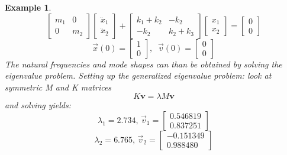 \documentclass[12pt,letter]{article}
\newtheorem{ex}{Example}
\numberwithin{ex}{section} %
\newenvironment{example}{\begin{mdframed}[middlelinewidth=0.5mm]\begin{ex}\normalfont}{\end{ex}\end{mdframed}}
\numberwithin{re}{section} %
\newcommand{\rd}[1]{\textcolor[rgb]{0.75,0.00,0.00}{#1}}
\begin{document}
\begin{example}
\begin{equation}
	  \begin{bmatrix} m_1 & 0 \\    0  & m_2 \end{bmatrix} \begin{bmatrix} \ddot{x}_1 \\    \ddot{x}_2  \end{bmatrix} + \begin{bmatrix} k_1 + k_2 & -k_2 \\  -k_2  & k_2 + k_3 \end{bmatrix} \begin{bmatrix} x_1 \\    x_2  \end{bmatrix} = \begin{bmatrix} 0 \\  0  \end{bmatrix} 
\end{equation}
\begin{equation}
	  \vec{x}(0) = \begin{bmatrix} 1 \\  0 \end{bmatrix},\; \; \vec{v}(0) = \begin{bmatrix} 0 \\  0 \end{bmatrix} \nonumber
\end{equation}
The natural frequencies and mode shapes can than be obtained by solving the eigenvalue problem. Setting up the generalized eigenvalue problem: \rd{look at symmetric M and K matrices} %
\begin{equation}
K \textbf{v} = \lambda M \textbf{v}
\end{equation}
and solving yields:
\begin{equation}
\lambda_1 = 2.734 \text{, } \vec{v}_1 = \begin{bmatrix} 0.546819 \\  0.837251 \end{bmatrix} 
\end{equation}
\begin{equation}
\lambda_2 = 6.765 \text{, } \vec{v}_2 = \begin{bmatrix} -0.151349 \\  0.988480 \end{bmatrix}  \nonumber

\end{equation}
\end{example}
\end{document}
